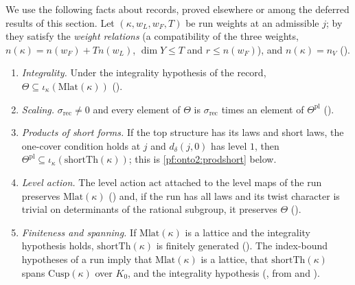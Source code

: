 We use the following facts about records, proved elsewhere or among the deferred results of this section. Let $(\kappa,w_L,w_F,T)$ be
run weights at an admissible $j$; by  they satisfy the \emph{weight relations}
(a compatibility of the three weights, $n(\kappa)=n(w_F)+Tn(w_L)$, $\dim Y\le T$ and $r\le n(w_F)$), and $n(\kappa)=n_V$
().
\begin{enumerate}[label=(F\arabic*)]
\item\label{pf:onto2:F1} \emph{Integrality.} Under the integrality hypothesis of the record, $\Theta\subseteq
  \iota_\kappa(\mathrm{Mlat}(\kappa))$ ().
\item\label{pf:onto2:F2} \emph{Scaling.} $\sigma_{\mathrm{rec}}\ne0$ and every element of $\Theta$ is $\sigma_{\mathrm{rec}}$ times an
  element of $\Theta^{\mathrm{pl}}$ ().
\item\label{pf:onto2:F3} \emph{Products of short forms.} If the top structure has its laws and short laws, the one-cover condition
  holds at $j$ and $d_\delta(j,0)$ has level $1$, then $\Theta^{\mathrm{pl}}\subseteq\iota_\kappa(\mathrm{shortTh}(\kappa))$; this is
  \cref{pf:onto2:prodshort} below.
\item\label{pf:onto2:F4} \emph{Level action.} The level action $\mathrm{act}$ attached to the level maps of the run preserves
  $\mathrm{Mlat}(\kappa)$ () and, if the run has all laws and its twist character
  is trivial on determinants of the rational subgroup, it preserves $\Theta$ ().
\item\label{pf:onto2:F5} \emph{Finiteness and spanning.} If $\mathrm{Mlat}(\kappa)$ is a lattice and the integrality hypothesis
  holds, $\mathrm{shortTh}(\kappa)$ is finitely generated (). The index-bound
  hypotheses of a run imply that $\mathrm{Mlat}(\kappa)$ is a lattice, that $\mathrm{shortTh}(\kappa)$ spans $\mathrm{Cusp}(\kappa)$
  over $K_0$, and the integrality hypothesis (, from
   and ).
\end{enumerate}

